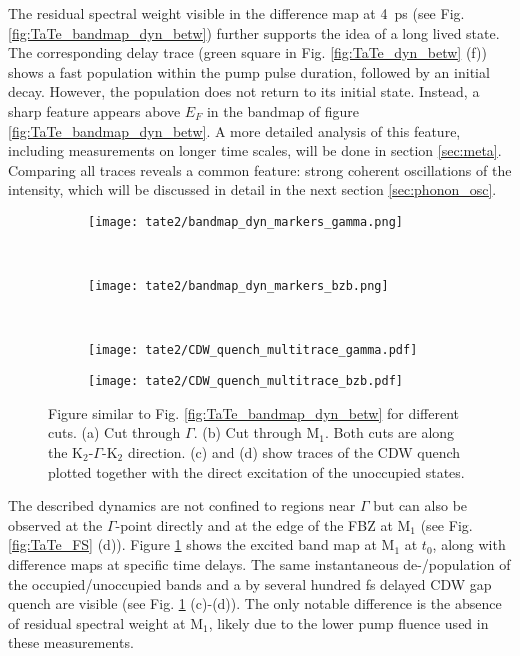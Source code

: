 The residual spectral weight visible in the difference map at \qty{4}{\pico\second} (see Fig. \ref{fig:TaTe_bandmap_dyn_betw}) further supports the idea of a long lived state.
The corresponding delay trace (green square in Fig. \ref{fig:TaTe_dyn_betw} (f)) shows a fast population within the pump pulse duration, followed by an initial decay.
However, the population does not return to its initial state.
Instead, a sharp feature appears above $E_F$ in the bandmap of figure \ref{fig:TaTe_bandmap_dyn_betw}.
A more detailed analysis of this feature, including measurements on longer time scales, will be done in section \ref{sec:meta}.
Comparing all traces reveals a common feature: strong coherent oscillations of the intensity, which will be discussed in detail in the next section \ref{sec:phonon_osc}.

\begin{figure}[t!]
	\centering
	\begin{subfigure}[b]{\textwidth}
		\texttt{[image: tate2/bandmap\_dyn\_markers\_gamma.png]}
		\caption{}
	\end{subfigure}
	\\
	\centering
	\begin{subfigure}[b]{\textwidth}
		\texttt{[image: tate2/bandmap\_dyn\_markers\_bzb.png]}
		\caption{}
	\end{subfigure}
	\\
	\begin{subfigure}[b]{0.33\textwidth}
		\texttt{[image: tate2/CDW\_quench\_multitrace\_gamma.pdf]}
		\caption{}
	\end{subfigure}
	\begin{subfigure}[b]{0.33\textwidth}
		\texttt{[image: tate2/CDW\_quench\_multitrace\_bzb.pdf]}
		\caption{}
	\end{subfigure}
	\caption{Figure similar to Fig. \ref{fig:TaTe_bandmap_dyn_betw} for different cuts. (a) Cut through $\Gamma$. (b) Cut through M$_1$. Both cuts are along the K$_2$-$\Gamma$-K$_2$ direction. (c) and (d) show traces of the CDW quench plotted together with the direct excitation of the unoccupied states.}
	\label{fig:TaTe_bandmap_dyn_bzb}
\end{figure}

The described dynamics are not confined to regions near $\Gamma$ but can also be observed at the $\Gamma$-point directly and at the edge of the FBZ at M$_1$ (see Fig. \ref{fig:TaTe_FS} (d)).
Figure \ref{fig:TaTe_bandmap_dyn_bzb} shows the excited band map at M$_1$ at $t_0$, along with difference maps at specific time delays.
The same instantaneous de-/population of the occupied/unoccupied bands and a by several hundred \unit{\femto\second} delayed CDW gap quench are visible (see Fig. \ref{fig:TaTe_bandmap_dyn_bzb} (c)-(d)).
The only notable difference is the absence of residual spectral weight at M$_1$, likely due to the lower pump fluence used in these measurements.

